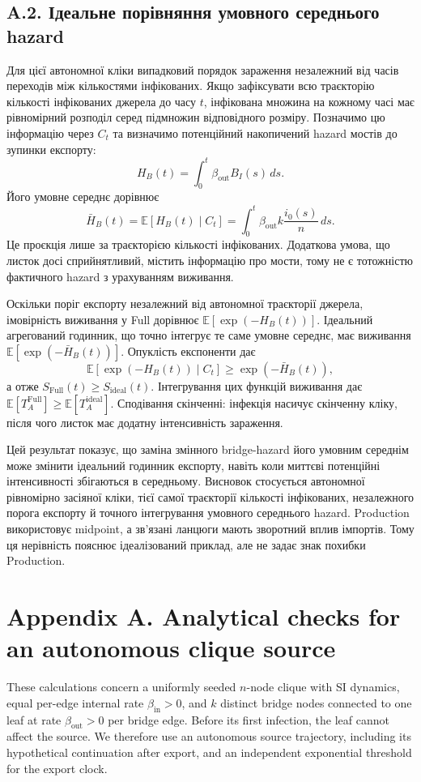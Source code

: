 \documentclass[10pt]{article}
\begin{document}
{\subsection*{A.2. Ідеальне порівняння умовного середнього hazard}
Для цієї автономної кліки випадковий порядок зараження незалежний від часів переходів між кількостями інфікованих. Якщо зафіксувати всю траєкторію кількості інфікованих джерела до часу $t$, інфікована множина на кожному часі має рівномірний розподіл серед підмножин відповідного розміру. Позначимо цю інформацію через $C_t$ та визначимо потенційний накопичений hazard мостів до зупинки експорту:
\begin{equation*}
H_B(t)=\int_0^t\beta_{\mathrm{out}}B_I(s)\,ds.
\end{equation*}
Його умовне середнє дорівнює
\begin{equation*}
\bar H_B(t)=\mathbb{E}[H_B(t)\mid C_t]=\int_0^t\beta_{\mathrm{out}}k\frac{i_0(s)}n\,ds.
\end{equation*}
Це проєкція лише за траєкторією кількості інфікованих. Додаткова умова, що листок досі сприйнятливий, містить інформацію про мости, тому не є тотожністю фактичного hazard з урахуванням виживання.

Оскільки поріг експорту незалежний від автономної траєкторії джерела, імовірність виживання у Full дорівнює $\mathbb{E}[\exp(-H_B(t))]$. Ідеальний агрегований годинник, що точно інтегрує те саме умовне середнє, має виживання $\mathbb{E}[\exp(-\bar H_B(t))]$. Опуклість експоненти дає
\begin{equation*}
\mathbb{E}[\exp(-H_B(t))\mid C_t]\geq \exp(-\bar H_B(t)),
\end{equation*}
а отже $S_{\mathrm{Full}}(t)\geq S_{\mathrm{ideal}}(t)$. Інтегрування цих функцій виживання дає $\mathbb{E}[T_A^{\mathrm{Full}}]\geq\mathbb{E}[T_A^{\mathrm{ideal}}]$. Сподівання скінченні: інфекція насичує скінченну кліку, після чого листок має додатну інтенсивність зараження.

Цей результат показує, що заміна змінного bridge-hazard його умовним середнім може змінити ідеальний годинник експорту, навіть коли миттєві потенційні інтенсивності збігаються в середньому. Висновок стосується автономної рівномірно засіяної кліки, тієї самої траєкторії кількості інфікованих, незалежного порога експорту й точного інтегрування умовного середнього hazard. Production використовує midpoint, а зв’язані ланцюги мають зворотний вплив імпортів. Тому ця нерівність пояснює ідеалізований приклад, але не задає знак похибки Production.
}{
\section*{Appendix A. Analytical checks for an autonomous clique source}
These calculations concern a uniformly seeded $n$-node clique with SI dynamics, equal per-edge internal rate $\beta_{\mathrm{in}}>0$, and $k$ distinct bridge nodes connected to one leaf at rate $\beta_{\mathrm{out}}>0$ per bridge edge. Before its first infection, the leaf cannot affect the source. We therefore use an autonomous source trajectory, including its hypothetical continuation after export, and an independent exponential threshold for the export clock.

}
\end{document}
